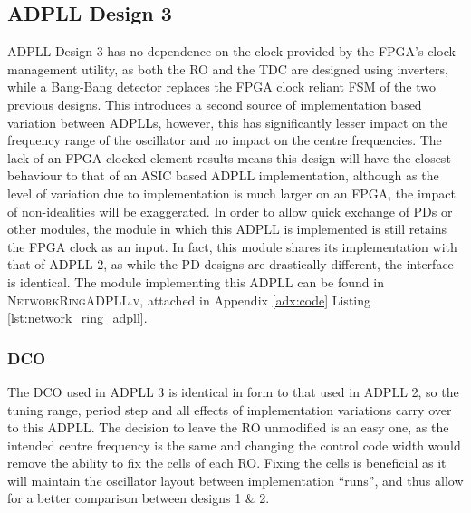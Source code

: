 \subsection{\acs{ADPLL} Design 3}
\acs{ADPLL} Design 3 has no dependence on the clock provided by the \ac{FPGA}'s clock management utility, as both the \ac{RO} and the \ac{TDC} are designed using inverters, while a Bang-Bang detector replaces the \ac{FPGA} clock reliant \ac{FSM} of the two previous designs. This introduces a second source of implementation based variation between \ac{ADPLL}s, however, this has significantly lesser impact on the frequency range of the oscillator and no impact on the centre frequencies. The lack of an \ac{FPGA} clocked element results means this design will have the closest behaviour to that of an \ac{ASIC} based \ac{ADPLL} implementation, although as the level of variation due to implementation is much larger on an \ac{FPGA}, the impact of non-idealities will be exaggerated.
In order to allow quick exchange of \ac{PD}s or other modules, the module in which this \ac{ADPLL} is implemented is still retains the \ac{FPGA} clock as an input. In fact, this module shares its implementation with that of \ac{ADPLL} 2, as while the \ac{PD} designs are drastically different, the interface is identical. The module implementing this \ac{ADPLL} can be found in \textsc{NetworkRingADPLL.v}, attached in Appendix \ref{adx:code} Listing \ref{lst:network_ring_adpll}.

\subsubsection{\acl{DCO}}
The \ac{DCO} used in \ac{ADPLL} 3 is identical in form to that used in \ac{ADPLL} 2, so the tuning range, period step and all effects of implementation variations carry over to this \ac{ADPLL}. The decision to leave the \ac{RO} unmodified is an easy one, as the intended centre frequency is the same and changing the control code width would remove the ability to fix the cells of each \ac{RO}. Fixing the cells is beneficial as it will maintain the oscillator layout between implementation ``runs'', and thus allow for a better comparison between designs 1 \& 2.

